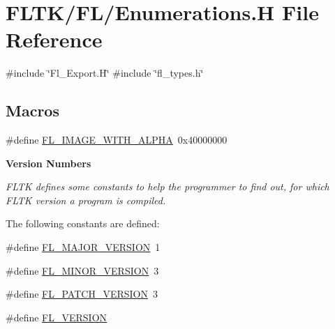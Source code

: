 \hypertarget{_enumerations_8_h}{}\section{F\+L\+T\+K/\+F\+L/\+Enumerations.H File Reference}
\label{_enumerations_8_h}
{\ttfamily \#include \char`\"{}Fl\+\_\+\+Export.\+H\char`\"{}}\newline
{\ttfamily \#include \char`\"{}fl\+\_\+types.\+h\char`\"{}}\newline
\subsection*{Macros}
\begin{DoxyCompactItemize}
\item 
\#define \hyperlink{_enumerations_8_h_a75fbead6c57b832581fb339b5f193e16}{F\+L\+\_\+\+I\+M\+A\+G\+E\+\_\+\+W\+I\+T\+H\+\_\+\+A\+L\+P\+HA}~0x40000000
\end{DoxyCompactItemize}
\begin{Indent}\textbf{ Version Numbers}\par
{\em F\+L\+TK defines some constants to help the programmer to find out, for which F\+L\+TK version a program is compiled.

The following constants are defined\+: }\begin{DoxyCompactItemize}
\item 
\#define \hyperlink{_enumerations_8_h_a10c923db4d613150c8a3937f9775ccd0}{F\+L\+\_\+\+M\+A\+J\+O\+R\+\_\+\+V\+E\+R\+S\+I\+ON}~1
\item 
\#define \hyperlink{_enumerations_8_h_a165d2781eff3186354a5f5db0528976d}{F\+L\+\_\+\+M\+I\+N\+O\+R\+\_\+\+V\+E\+R\+S\+I\+ON}~3
\item 
\#define \hyperlink{_enumerations_8_h_afc7b82e6fcfbb451d38e8a0cacde302a}{F\+L\+\_\+\+P\+A\+T\+C\+H\+\_\+\+V\+E\+R\+S\+I\+ON}~3
\item 
\#define \hyperlink{_enumerations_8_h_a94499c96b5f3ca212d90a2c41f947a67}{F\+L\+\_\+\+V\+E\+R\+S\+I\+ON}
\end{DoxyCompactItemize}
\end{Indent}
